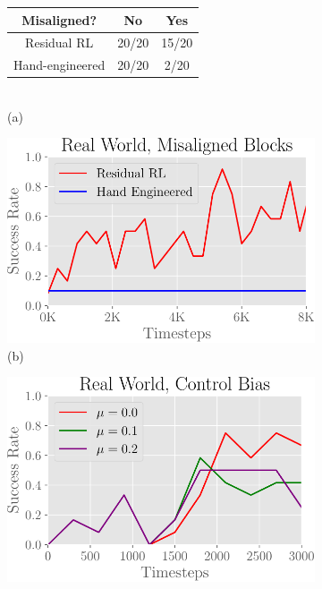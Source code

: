 \begin{figure}[ht!]
    \vspace{6pt}
    \centering
    \begin{subfigure}[b]{0.38\linewidth}
    \renewcommand{\arraystretch}{1.5}
    \footnotesize
        \begin{tabular}{ | c || c | c |}
            \hline
            Misaligned? & No & Yes  \\ \hline
            Residual RL & 20/20 & 15/20  \\ \hline
            Hand-engineered  & 20/20 & 2/20  \\ \hline
        \end{tabular}
        \vspace{.8cm} \\
        \centering
        \normalsize{(a)}
    \end{subfigure}
    \begin{subfigure}[b]{0.3\linewidth}
        \includegraphics[width=0.99\linewidth]{residualrl/figs/real_world_envvar_success.pdf} \\
        \centering
        (b)
    \end{subfigure}
    \begin{subfigure}[b]{0.3\linewidth}
        \includegraphics[width=0.99\linewidth]{residualrl/figs/real_world_control_bias.pdf} \\

\end{subfigure}
\end{figure}
